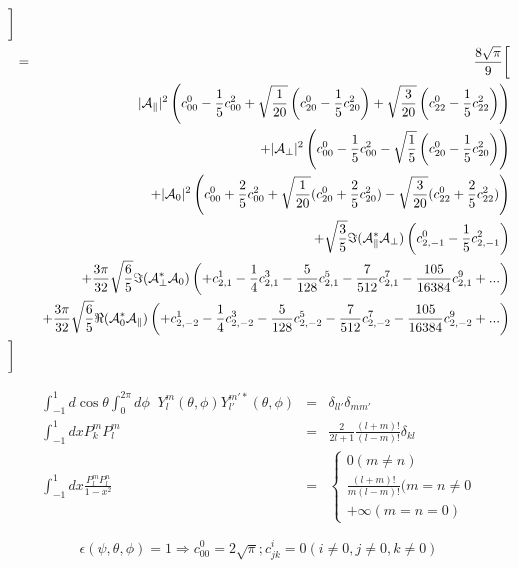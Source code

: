 \documentclass[a4paper,9pt,twoside]{article}
\begin{document}
\begin{eqnarray}
      \biggr] \\
      &=& \frac{8\sqrt{\pi}}{9}  \biggl[ \\
         &&                    |{\cal A}_\parallel|^2 \left( c^0_{00}-\frac{1}{5}c^2_{00}+\sqrt{\frac{1}{20}}\left(c^0_{20}-\frac{1}{5}c^2_{20}\right)+\sqrt{\frac{3}{20}}\left(c^0_{22}-\frac{1}{5}c^2_{22}\right)  \right)  \\
         &&                   +|{\cal A}_\perp|^2    \left( c^0_{00}-\frac{1}{5}c^2_{00} - \sqrt{\frac{1}{5}}\left(c^0_{20}-\frac{1}{5}c^2_{20}\right)\right)\\
         &&                   +|{\cal A}_0|^2   \left( c^0_{00}+\frac{2}{5}c^2_{00}+\sqrt{\frac{1}{20}}(c^0_{20}+\frac{2}{5}c^2_{20})-\sqrt{\frac{3}{20}}(c^0_{22}+\frac{2}{5}c^2_{22}) \right) \\
         &&                   +\sqrt{\frac{3}{5}}\Im({\cal A}_\parallel^*{\cal A}_\perp)\left(c^0_{2,-1}-\frac{1}{5}c^2_{2,-1}\right)  \\
         &&                   +\frac{3\pi}{32}\sqrt{\frac{6}{5}}\Im({\cal A}_\perp^* {\cal A}_0 )  \left( +c^1_{2,1} -\frac{1}{4}c^3_{2,1}- \frac{5}{128}c^5_{2,1} -\frac{7}{512}c^7_{2,1} - \frac{105}{16384}c^9_{2,1}+... \right) \\
         &&                   +\frac{3\pi}{32}\sqrt{\frac{6}{5}}\Re({\cal A}_0^*{\cal A}_\parallel)\left( +c^1_{2,-2}-\frac{1}{4}c^3_{2,-2}-\frac{5}{128}c^5_{2,-2}-\frac{7}{512}c^7_{2,-2} - \frac{105}{16384}c^9_{2,-2}+... \right) \\
      \biggr]
\end{eqnarray}

\begin{eqnarray}
\int_{-1}^1 d\cos\theta \int_0^{2\pi} d\phi \;\;Y_l^m(\theta,\phi) Y_{l'}^{m'*}(\theta,\phi) &=& \delta_{ll'}\delta_{mm'}\\
\int_{-1}^1 dx  P_k^m P_l^m&=& \frac{2}{2l+1}\frac{(l+m)!}{(l-m)!}\delta_{kl} \\
\int_{-1}^1 dx \frac{P^m_l P^n_l } { 1 - x^2 }  &=&  \left\{  \begin{array}{l} 0 (m\neq n) \\   \frac{(l+m)!}{m(l-m)!}(m=n\neq 0\\ +\infty (m=n=0) \end{array} \right.
\end{eqnarray}


\begin{equation}
   \epsilon(\psi,\theta,\phi) = 1 \Rightarrow c^0_{00} = 2\sqrt{\pi} ; c^{i}_{jk} = 0 (i\neq 0, j\neq 0, k \neq 0)
\end{equation}
\end{document}
